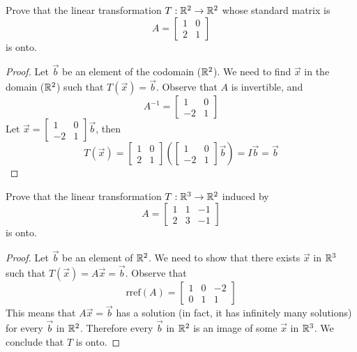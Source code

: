 \documentclass{ximera}
\begin{document}
\begin{example}\label{ex:onto1} Prove that the linear transformation $T:\mathbb{R}^2\rightarrow \mathbb{R}^2$ whose standard matrix is $$A=\begin{bmatrix}1&0\\2&1\end{bmatrix}$$ is onto.
\begin{proof} Let $\vec{b}$ be an element of the codomain ($\mathbb{R}^2$).  We need to find $\vec{x}$ in the domain ($\mathbb{R}^2$) such that $T(\vec{x})=\vec{b}$. 
Observe that $A$ is invertible, and $$A^{-1}=\begin{bmatrix}1&0\\-2&1\end{bmatrix}$$
 Let $\vec{x}=\begin{bmatrix}1&0\\-2&1\end{bmatrix}\vec{b}$, then 
 $$T(\vec{x})=\begin{bmatrix}1&0\\2&1\end{bmatrix}\left(\begin{bmatrix}1&0\\-2&1\end{bmatrix}\vec{b}\right)=I\vec{b}=\vec{b}$$
\end{proof}
\end{example}

\begin{example}\label{ex:onto2} Prove that the linear transformation $T:\mathbb{R}^3\rightarrow \mathbb{R}^2$ induced by $$A=\begin{bmatrix}1&1&-1\\2&3&-1\end{bmatrix}$$ is onto.


\begin{proof}

Let $\vec{b}$ be an element of $\mathbb{R}^2$.  We need to show that there exists $\vec{x}$ in $\mathbb{R}^3$ such that $T(\vec{x})=A\vec{x}=\vec{b}$. 
Observe that
 $$\mbox{rref}(A)=\begin{bmatrix}1 & 0 & -2\\0 & 1 & 1\end{bmatrix}$$
 This means that $A\vec{x}=\vec{b}$ has a solution (in fact, it has infinitely many solutions) for every $\vec{b}$ in $\mathbb{R}^2$.  Therefore every $\vec{b}$ in $\mathbb{R}^2$ is an image of some $\vec{x}$ in $\mathbb{R}^3$. We conclude that $T$ is onto. 
\end{proof}
\end{example}
\end{document}

